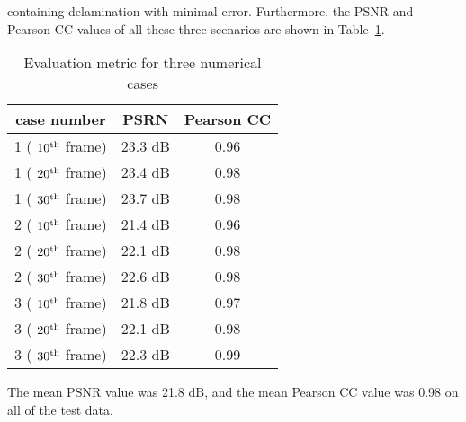 containing delamination with minimal error. 
Furthermore, the PSNR and Pearson CC values of all these three scenarios are 
shown in Table~\ref{tab:psnr_pearson}. 
\begin{table}[ht]
	\centering
	\caption{Evaluation metric for three numerical cases}
	\begin{tabular}{@{}ccc@{}}
		\toprule
		case number       & PSRN    & Pearson CC \\ \midrule
		1 ( $10\textsuperscript{th}$ frame) & 23.3 dB & 0.96       \\ \midrule
		1 ( $20\textsuperscript{th}$ frame)    & 23.4 dB & 0.98       \\ 
		\midrule
		1 ( $30\textsuperscript{th}$ frame)    & 23.7 dB & 0.98       \\ 
		\midrule
		2 ( $10\textsuperscript{th}$ frame) & 21.4 dB & 0.96       \\ \midrule
		2 ( $20\textsuperscript{th}$ frame)    & 22.1 dB & 0.98       \\ 
		\midrule
		2 ( $30\textsuperscript{th}$ frame)    & 22.6 dB & 0.98       \\ 
		\midrule
		3 ( $10\textsuperscript{th}$ frame) & 21.8 dB & 0.97       \\ \midrule
		3 ( $20\textsuperscript{th}$ frame) & 22.1 dB & 0.98       \\ \midrule
		3 ( $30\textsuperscript{th}$ frame)    & 22.3 dB & 0.99       \\ 
		\bottomrule
	\end{tabular}
	\label{tab:psnr_pearson}
\end{table}


The mean PSNR value was 21.8 dB, and the mean Pearson CC value was 0.98 
on all of the test data.

